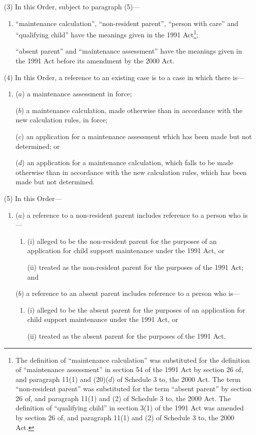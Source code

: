 \documentclass[12pt,a4paper]{article}
\begin{document}
(3) In this Order, subject to paragraph (5)—
\begin{enumerate}\item[]
“maintenance calculation”, “non-resident parent”, “person with care” and “qualifying child” have the meanings given in the 1991 Act\footnote{The definition of “maintenance calculation” was substituted for the definition of “maintenance assessment” in section 54 of the 1991 Act by section 26 of, and paragraph 11(1) and (20)($d$)  of Schedule 3 to, the 2000 Act. The term “non-resident parent” was substituted for the term “absent parent” by section 26 of, and paragraph 11(1) and (2) of Schedule 3 to, the 2000 Act. The definition of “qualifying child” in section 3(1) of the 1991 Act was amended by section 26 of, and paragraph 11(1) and (2) of Schedule 3 to, the 2000 Act.};

“absent parent” and “maintenance assessment” have the meanings given in the 1991 Act before its amendment by the 2000 Act.
\end{enumerate}

(4) In this Order, a reference to an existing case is to a case in which there is—
\begin{enumerate}\item[]
($a$) a maintenance assessment in force;

($b$) a maintenance calculation, made otherwise than in accordance with the new calculation rules, in force;

($c$) an application for a maintenance assessment which has been made but not determined; or

($d$) an application for a maintenance calculation, which falls to be made otherwise than in accordance with the new calculation rules, which has been made but not determined.
\end{enumerate}

(5) In this Order—
\begin{enumerate}\item[]
($a$) a reference to a non-resident parent includes reference to a person who is—
\begin{enumerate}\item[]
(i) alleged to be the non-resident parent for the purposes of an application for child support maintenance under the 1991 Act, or

(ii) treated as the non-resident parent for the purposes of the 1991 Act; and
\end{enumerate}

($b$) a reference to an absent parent includes reference to a person who is—
\begin{enumerate}\item[]
(i) alleged to be the absent parent for the purposes of an application for child support maintenance under the 1991 Act, or

(ii) treated as the absent parent for the purposes of the 1991 Act.
\end{enumerate}
\end{enumerate}
\end{document}
